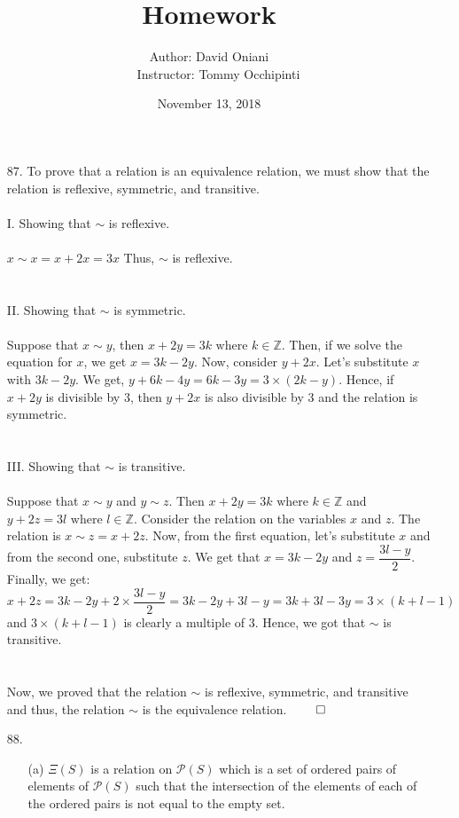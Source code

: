 \documentclass[12pt, a4paper]{article}
\title{\bf{Homework \textnumero 12}}
\author{Author: David Oniani
\\
\ \ \ Instructor: Tommy Occhipinti}
\date{November 13, 2018}
\newcommand{\ints}{\mathbb{Z}}
\begin{document}
\maketitle
\begin{itemize}
\item[87.]
To prove that a relation is an equivalence relation, we must show that the
relation is reflexive, symmetric, and transitive.\\\\
I. Showing that $\sim$ is reflexive.\\\\
$x \sim x = x + 2x = 3x$ Thus, $\sim$ is reflexive.\\\\\\
II. Showing that $\sim$ is symmetric.\\\\
Suppose that $x \sim y$, then $x + 2y = 3k \mbox{ where } k \in \ints$. Then, if we solve the
equation for $x$, we get $x = 3k - 2y$. Now, consider $y + 2x$. Let's substitute $x$ with $3k - 2y$.
We get, $y + 6k - 4y = 6k - 3y = 3 \times (2k - y)$. Hence, if $x + 2y$ is divisible by 3, then $y + 2x$
is also divisible by 3 and the relation is symmetric.\\\\\\
III. Showing that $\sim$ is transitive.\\\\
Suppose that $x \sim y$ and $y \sim z$. Then $x + 2y = 3k \mbox{ where } k \in \ints$ and $y + 2z = 3l \mbox{ where } l \in \ints$.
Consider the relation on the variables $x$ and $z$. The relation is $x \sim z = x + 2z$. Now, from the first equation, let's substitute $x$
and from the second one, substitute $z$. We get that $x = 3k - 2y$ and $z = \dfrac{3l - y}{2}$. Finally, we get:
$x + 2z = 3k - 2y + 2 \times \dfrac{3l - y}{2} = 3k - 2y + 3l - y = 3k + 3l - 3y = 3 \times (k + l - 1)$ and $3 \times (k + l - 1)$
is clearly a multiple of 3. Hence, we got that $\sim$ is transitive.
\\\\\\
Now, we proved that the relation $\sim$ is reflexive, symmetric, and transitive and thus, the relation $\sim$
is the equivalence relation.
$\qed$

\newpage

\item[88.]
\begin{itemize}
\item[(a)]
$\Xi(S)$ is a relation on $\mathcal{P}(S)$ which is a set of ordered pairs of elements of $\mathcal{P}(S)$
such that the intersection of the elements of each of the ordered pairs is not equal to the empty set.


\end{itemize}
\end{itemize}
\end{document}
